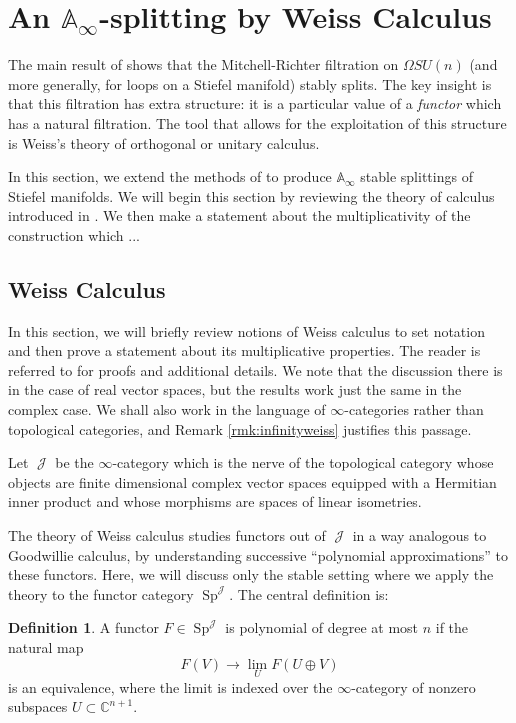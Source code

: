 \documentclass[reqno, oneside]{amsart}
\theoremstyle{definition}
\newtheorem{dfn}[nul]{Definition}
\theoremstyle{plain}
\DeclareMathOperator{\Sp}{\text{Sp}}
\DeclareMathOperator{\J}{\mathcal{J}}
\begin{document}
\section{An \texorpdfstring{$\mathbb{A}_\infty$}{Aoo}-splitting by Weiss Calculus} \label{sec:AooSplit}

The main result of \cite{Arone} shows that the Mitchell-Richter filtration on $\Omega SU(n)$ (and more generally, for loops on a Stiefel manifold) stably splits.  The key insight is that this filtration has extra structure: it is a particular value of a \emph{functor} which has a natural filtration.  The tool that allows for the exploitation of this structure is Weiss's theory of orthogonal or unitary calculus.  

In this section, we extend the methods of \cite{Arone} to produce $\mathbb{A}_\infty$ stable splittings of Stiefel manifolds.  We will begin this section by reviewing the theory of calculus introduced in \cite{Weiss}.  We then make a statement about the multiplicativity of the construction which ...%

\subsection{Weiss Calculus}
In this section, we will briefly review notions of Weiss calculus to set notation and then prove a statement about its multiplicative properties.  The reader is referred to \cite{Weiss} for proofs and additional details.  We note that the discussion there is in the case of real vector spaces, but the results work just the same in the complex case.  We shall also work in the language of $\infty$-categories rather than topological categories, and Remark \ref{rmk:infinityweiss} justifies this passage.  

Let $\J$ be the $\infty$-category which is the nerve of the topological category whose objects are finite dimensional complex vector spaces equipped with a Hermitian inner product and whose morphisms are spaces of linear isometries.  

The theory of Weiss calculus studies functors out of $\J$ in a way analogous to Goodwillie calculus, by understanding successive ``polynomial approximations'' to these functors.  Here, we will discuss only the stable setting where we apply the theory to the functor category $\Sp^{\J}$. The central definition is:

\begin{dfn}\label{dfn:polyfun}
A functor $F\in \Sp^{\J}$ is polynomial of degree at most $n$ if the natural map $$F(V) \to \lim_U F(U\oplus V)$$ is an equivalence, where the limit is indexed over the $\infty$-category of nonzero subspaces $U\subset \mathbb{C}^{n+1}.$
\end{dfn}
\end{document}
